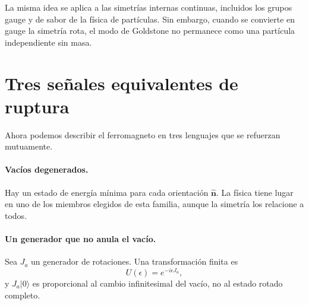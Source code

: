 
La misma idea se aplica a las simetrías internas continuas, incluidos los grupos gauge y de sabor de la física de partículas. Sin embargo, cuando se convierte en gauge la simetría rota, el modo de Goldstone no permanece como una partícula independiente sin masa.

\begin{classroomqa}
\end{classroomqa}

\section{Tres señales equivalentes de ruptura}

Ahora podemos describir el ferromagneto en tres lenguajes que se refuerzan mutuamente.

\paragraph{Vacíos degenerados.}
Hay un estado de energía mínima para cada orientación \(\hat{\mathbf n}\). La física tiene lugar en uno de los miembros elegidos de esta familia, aunque la simetría los relacione a todos.

\paragraph{Un generador que no anula el vacío.}
Sea \(J_a\) un generador de rotaciones. Una transformación finita es
\begin{equation}
U(\epsilon)=e^{-i\epsilon J_a},
\end{equation}
y \(J_a|0\rangle\) es proporcional al cambio infinitesimal del vacío, no al estado rotado completo.

\begin{classroomqa}
\end{classroomqa}

